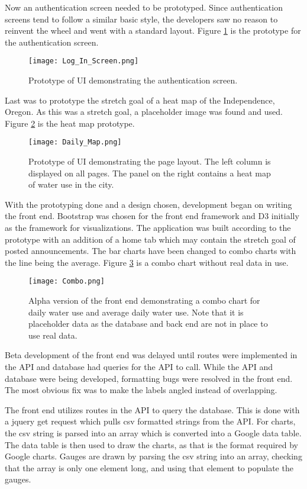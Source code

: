 \documentclass[journal]{IEEEtran}
\begin{document}
Now an authentication screen needed to be prototyped. Since authentication screens tend to follow a similar basic style, the developers saw no reason to reinvent the wheel and went with a standard layout. Figure \ref{fig:logon} is the prototype for the authentication screen.

\begin{figure}[H]
  \texttt{[image: Log\_In\_Screen.png]}
  \caption{Prototype of UI demonstrating the authentication screen.}
  \label{fig:logon}
\end{figure}

Last was to prototype the stretch goal of a heat map of the Independence, Oregon. As this was a stretch goal, a placeholder image was found and used. Figure \ref{fig:heatmap} is the heat map prototype.

\begin{figure}[H]
  \texttt{[image: Daily\_Map.png]}
  \caption{Prototype of UI demonstrating the page layout. The left column is displayed on all pages. The panel on the right contains a heat map of water use in the city.}
  \label{fig:heatmap}
\end{figure}

With the prototyping done and a design chosen, development began on writing the front end. Bootstrap was chosen for the front end framework and D3 initially as the framework for visualizations. The application was built according to the prototype with an addition of a home tab which may contain the stretch goal of posted announcements. The bar charts have been changed to combo charts with the line being the average. Figure \ref{fig:combo} is a combo chart without real data in use.

\begin{figure}[H]
  \texttt{[image: Combo.png]}
  \caption{Alpha version of the front end demonstrating a combo chart for daily water use and average daily water use. Note that it is placeholder data as the database and back end are not in place to use real data.}
  \label{fig:combo}
\end{figure}

Beta development of the front end was delayed until routes were implemented in the API and database had queries for the API to call. While the API and database were being developed, formatting bugs were resolved in the front end. The most obvious fix was to make the labels angled instead of overlapping.

The front end utilizes routes in the API to query the database. This is done with a jquery get request which pulls csv formatted strings from the API. For charts, the csv string is parsed into an array which is converted into a Google data table. The data table is then used to draw the charts, as that is the format required by Google charts. Gauges are drawn by parsing the csv string into an array, checking that the array is only one element long, and using that element to populate the gauges.
\end{document}
